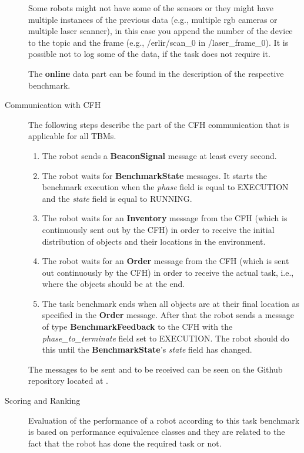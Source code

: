 \begin{description}
Some robots might not have some of the sensors or they might have multiple instances of the previous data (e.g., multiple rgb cameras or multiple laser scanner), in this case you append the number of the device to the topic and the frame (e.g., /erlir/scan\_0 in /laser\_frame\_0). It is possible not to log some of the data, if the task does not require it.

The \textbf{online} data part can be found in the description of the respective benchmark.
\item[Communication with CFH]
\label{sec:CommCFH}
The following steps describe the part of the CFH communication that is applicable for all TBMs.

\begin{enumerate}
	\item The robot sends a \textbf{BeaconSignal} message at least every second.
	\item The robot waits for \textbf{BenchmarkState} messages. It starts the benchmark execution when the \emph{phase} field is equal to EXECUTION and the \emph{state} field is equal to RUNNING.
	\item The robot waits for an \textbf{Inventory} message from the CFH (which is continuously sent out by the CFH) in order to receive the initial distribution of objects and their locations in the environment.
	\item The robot waits for an \textbf{Order} message from the CFH (which is sent out continuously by the CFH) in order to receive the actual task, i.e., where the objects should be at the end.
	\item The task benchmark ends when all objects are at their final location as specified in the \textbf{Order} message. After that the robot sends a message of type \textbf{BenchmarkFeedback} to the CFH with the \emph{phase\_to\_terminate} field set to EXECUTION. The robot should do this until the \textbf{BenchmarkState}'s \emph{state} field has changed.
\end{enumerate}

The messages to be sent and to be received can be seen on the Github repository located at \cite{rockin:CFHMessages}.

\item[Scoring and Ranking] 
Evaluation of the performance of a robot according to this task benchmark is based on performance equivalence classes and they are related to the fact that the robot has done the required task or not. 


\end{description}
